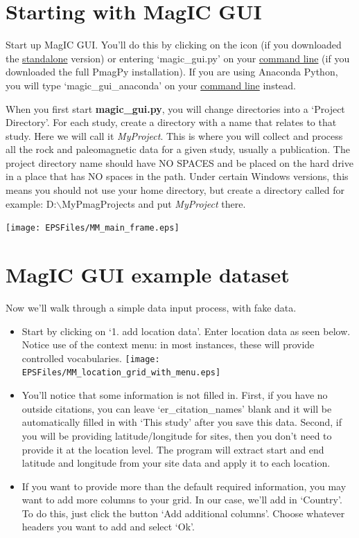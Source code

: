 \documentclass[11pt]{book}
\begin{document}
{{\section{Starting with MagIC GUI}
Start up MagIC GUI.  You'll do this by clicking on the icon (if you downloaded the \href{#standalone}{standalone} version) or entering `magic\_gui.py' on your \href{#command_line}{command line} (if you downloaded the full PmagPy installation).  If you are using Anaconda Python, you will type `magic\_gui\_anaconda' on your \href{#command_line}{command line} instead.

When you first start {\bf magic\_gui.py}, you will change directories into a  `Project Directory'. For each study, create a directory with a name that relates to that study. Here we will call it {\it MyProject}.  This is where you will collect  and process all the rock and paleomagnetic data for a given study, usually a publication.   The project directory name should have NO SPACES and be placed on the hard drive in a place that has NO spaces in the path. Under certain Windows versions, this means you should not use your home directory, but create a directory called for example: D:$\backslash$MyPmagProjects and put {\it MyProject} there.

  \texttt{[image: EPSFiles/MM\_main\_frame.eps]}

\section{MagIC GUI example dataset}
Now we'll walk through a simple data input process, with fake data.
  \begin{itemize}
  \item Start by clicking on `1. add location data'.  Enter location data as seen below. Notice use of the context menu: in most instances, these will provide controlled vocabularies.
    \texttt{[image: EPSFiles/MM\_location\_grid\_with\_menu.eps]}
  \item You'll notice that some information is not filled in.  First, if you have no outside citations, you can leave `er\_citation\_names' blank and it will be automatically filled in with `This study' after you save this data.  Second, if you will be providing latitude/longitude for sites, then you don't need to provide it at the location level.  The program will extract start and end latitude and longitude from your site data and apply it to each location.
  \item If you want to provide more than the default required information, you may want to add more columns to your grid.  In our case, we'll add in `Country'.  To do this, just click the button `Add additional columns'.  Choose whatever headers you want to add and select `Ok'.


\end{itemize}}}
\end{document}
